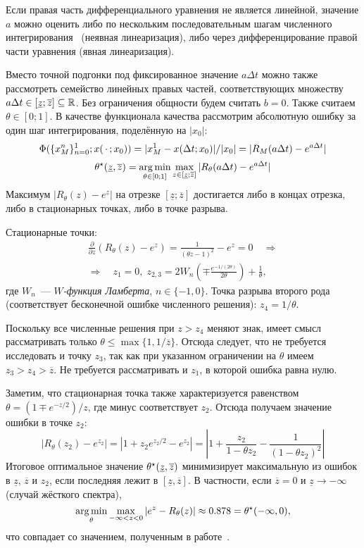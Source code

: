 Если правая часть дифференциального уравнения не является линейной,
значение $ a $ можно оценить либо по нескольким последовательным шагам численного интегрирования~\cite{berzins1992adaptive_theta_method}
(неявная линеаризация),
либо через дифференцирование правой части уравнения (явная линеаризация).

Вместо точной подгонки под фиксированное значение $ a \Delta t $
можно также рассмотреть семейство линейных правых частей,
соответствующих множеству $ a \Delta t \in [\underline{z}; \overline{z}] \subseteq \mathbb{R} $.
Без ограничения общности будем считать $ b = 0 $.
Также считаем $ \theta \in [0;1] $.
В качестве функционала качества рассмотрим абсолютную ошибку за один шаг интегрирования,
поделённую на $ |x_0| $:
\[
    \Phi(\{ x_M^n \}_{n=0}^1; x(\,\cdot\,; x_0)) = |x^1_M - x(\Delta t; x_0)| / |x_0| = |R_M(a \Delta t) - e^{a \Delta t}|
\]
%
\begin{equation}
    \label{eq:one_dimensional_linear_system:optimal_theta_for_stiff_systems}
    \theta^\star(\underline{z}, \overline{z}) = \operatorname*{\arg\min}_{\theta \in [0;1]}
    \max_{z \in [\underline{z}; \overline{z}]} |R_\theta(a \Delta t) - e^{a \Delta t}|
\end{equation}
%
Максимум $ |R_\theta(z) - e^z| $ на отрезке $ [\underline{z}; \overline{z}] $ достигается либо в концах отрезка,
либо в стационарных точках, либо в точке разрыва.

Стационарные точки:
%
\begin{multline*}
    \frac{\partial}{\partial z} (R_\theta(z) - e^z) = \frac{1}{(\theta z - 1)^2} - e^z = 0 \quad \Longrightarrow \\
    \Longrightarrow \quad z_1 = 0, \;
    z_{2,3} = 2 W_n \left( \mp \frac{e^{-1 / (2 \theta)}}{2 \theta} \right) + \frac{1}{\theta},
\end{multline*}
%
где $ W_n $~--- \emph{$ W $-функция Ламберта}, $ n \in \{ -1, 0 \} $.
Точка разрыва второго рода (соответствует бесконечной ошибке численного решения): $ z_4 = 1/\theta $.

Поскольку все численные решения при $ z > z_4 $ меняют знак,
имеет смысл рассматривать только $ \theta \leqslant \max \{ 1, 1/\overline{z} \} $.
Отсюда следует, что не требуется исследовать и точку $ z_3 $,
так как при указанном ограничении на $ \theta $ имеем $ z_3 > z_4 > \overline{z} $.
Не требуется рассматривать и $ z_1 $, в которой ошибка равна нулю.

Заметим, что стационарная точка также характеризуется равенством
$ \theta = (1 \mp e^{-z/2}) / z $, где минус соответствует $ z_2 $.
Отсюда получаем значение ошибки в точке $ z_2 $:
\[
    |R_\theta(z_2) - e^{z_2}| = |1 + z_2 e^{z_2/2} - e^{z_2}| =
    \left|1 + \frac{z_2}{1 - \theta z_2} - \frac{1}{(1 - \theta z_2)^2} \right|
\]
Итоговое оптимальное значение $ \theta^\star(\underline{z}, \overline{z}) $
минимизирует максимальную из ошибок в $ \underline{z} $, $ \overline{z} $ и
$ z_2 $, если последняя лежит в $ [\underline{z}, \overline{z}] $.
В частности, если $ \overline{z} = 0 $ и $ \underline{z} \to -\infty $ (случай жёсткого спектра),
\[
    \operatorname*{\arg\min}_\theta \max_{- \infty < z < 0} | e^z - R_\theta(z) | \approx 0.878 = \theta^\star(-\infty, 0),
\]
что совпадает со значением, полученным в работе~\cite{liniger1969global_accuracy}.

